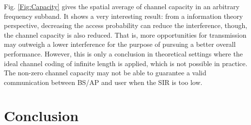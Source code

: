 \documentclass[a4paper,twocolumn]{IEEEtran}
\begin{document}
Fig. \ref{Fig:Capacity} gives the spatial average of channel capacity in an arbitrary frequency subband. It shows a very interesting result: from a information theory perspective, decreasing the access probability can reduce the interference, though, the channel capacity is also reduced. That is, more opportunities for transmission may outweigh a lower interference for the purpose of pursuing a better overall performance. However, this is only a conclusion in theoretical settings where the ideal channel coding of infinite length is applied, which is not possible in practice. The non-zero channel capacity may not be able to guarantee a valid communication between BS/AP and user when the SIR is too low.    
\section{Conclusion}\label{Sec:Con}

  
\end{document}
